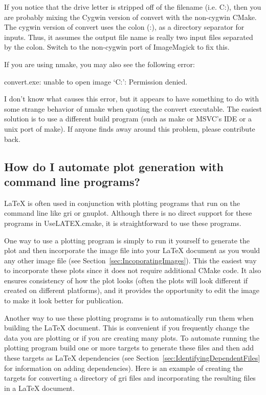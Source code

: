 \documentclass{article}
\newcommand*{\textfile}[1]{\textsf{#1}}
\newcommand*{\textprog}[1]{\textfile{#1}}
\newcommand*{\UseLATEX}{\textfile{UseLATEX.cmake}\xspace}
\newcommand*{\latex}{\LaTeX\xspace}
\begin{document}
  If you notice that the drive letter is stripped off of the filename
  (i.e. \textfile{C:}), then you are probably mixing the Cygwin version of
  \textprog{convert} with the non-cygwin CMake. The cygwin version of
  \textprog{convert} uses the colon (:), as a directory separator for
  inputs. Thus, it assumes the output file name is really two input files
  separated by the colon. Switch to the non-cygwin port of ImageMagick to
  fix this.

  If you are using nmake, you may also see the following error: 

  \begin{CodeListing}
convert.exe: unable to open image `C:': Permission denied.
  \end{CodeListing}

  I don't know what causes this error, but it appears to have something to
  do with some strange behavior of nmake when quoting the convert
  executable. The easiest solution is to use a different build program
  (such as make or MSVC's IDE or a unix port of make). If anyone finds away
  around this problem, please contribute back.

  \subsection{How do I automate plot generation with command line programs?}
  \label{How_do_I_automate_plot_generation_with_command_line_programs}

  \latex is often used in conjunction with plotting programs that run on
  the command line like \textprog{gri} or \textprog{gnuplot}.  Although
  there is no direct support for these programs in \UseLATEX, it is
  straightforward to use these programs.

  One way to use a plotting program is simply to run it yourself to
  generate the plot and then incorporate the image file into your \latex
  document as you would any other image file (see
  Section~\ref{sec:IncoporatingImages}).  This the easiest way to
  incorporate these plots since it does not require additional CMake code.
  It also ensures consistency of how the plot looks (often the plots will
  look different if created on different platforms), and it provides the
  opportunity to edit the image to make it look better for publication.

  Another way to use these plotting programs is to automatically run them
  when building the \latex document.  This is convenient if you frequently
  change the data you are plotting or if you are creating many plots.  To
  automate running the plotting program build one or more targets to
  generate these files and then add these targets as \latex dependencies
  (see Section~\ref{sec:IdentifyingDependentFiles} for information on
  adding dependencies).  Here is an example of creating the targets for
  converting a directory of \textprog{gri} files and incorporating the
  resulting files in a \latex document.
\end{document}
